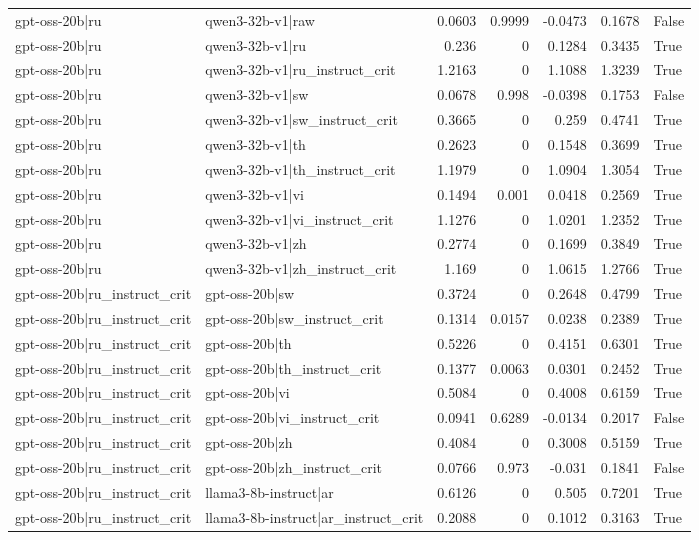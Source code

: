\begin{table}
\begin{tabular}{l l r r r r l}
gpt-oss-20b|ru & qwen3-32b-v1|raw & 0.0603 & 0.9999 & -0.0473 & 0.1678 & False \\
gpt-oss-20b|ru & qwen3-32b-v1|ru & 0.236 & 0 & 0.1284 & 0.3435 & True \\
gpt-oss-20b|ru & qwen3-32b-v1|ru_instruct_crit & 1.2163 & 0 & 1.1088 & 1.3239 & True \\
gpt-oss-20b|ru & qwen3-32b-v1|sw & 0.0678 & 0.998 & -0.0398 & 0.1753 & False \\
gpt-oss-20b|ru & qwen3-32b-v1|sw_instruct_crit & 0.3665 & 0 & 0.259 & 0.4741 & True \\
gpt-oss-20b|ru & qwen3-32b-v1|th & 0.2623 & 0 & 0.1548 & 0.3699 & True \\
gpt-oss-20b|ru & qwen3-32b-v1|th_instruct_crit & 1.1979 & 0 & 1.0904 & 1.3054 & True \\
gpt-oss-20b|ru & qwen3-32b-v1|vi & 0.1494 & 0.001 & 0.0418 & 0.2569 & True \\
gpt-oss-20b|ru & qwen3-32b-v1|vi_instruct_crit & 1.1276 & 0 & 1.0201 & 1.2352 & True \\
gpt-oss-20b|ru & qwen3-32b-v1|zh & 0.2774 & 0 & 0.1699 & 0.3849 & True \\
gpt-oss-20b|ru & qwen3-32b-v1|zh_instruct_crit & 1.169 & 0 & 1.0615 & 1.2766 & True \\
gpt-oss-20b|ru_instruct_crit & gpt-oss-20b|sw & 0.3724 & 0 & 0.2648 & 0.4799 & True \\
gpt-oss-20b|ru_instruct_crit & gpt-oss-20b|sw_instruct_crit & 0.1314 & 0.0157 & 0.0238 & 0.2389 & True \\
gpt-oss-20b|ru_instruct_crit & gpt-oss-20b|th & 0.5226 & 0 & 0.4151 & 0.6301 & True \\
gpt-oss-20b|ru_instruct_crit & gpt-oss-20b|th_instruct_crit & 0.1377 & 0.0063 & 0.0301 & 0.2452 & True \\
gpt-oss-20b|ru_instruct_crit & gpt-oss-20b|vi & 0.5084 & 0 & 0.4008 & 0.6159 & True \\
gpt-oss-20b|ru_instruct_crit & gpt-oss-20b|vi_instruct_crit & 0.0941 & 0.6289 & -0.0134 & 0.2017 & False \\
gpt-oss-20b|ru_instruct_crit & gpt-oss-20b|zh & 0.4084 & 0 & 0.3008 & 0.5159 & True \\
gpt-oss-20b|ru_instruct_crit & gpt-oss-20b|zh_instruct_crit & 0.0766 & 0.973 & -0.031 & 0.1841 & False \\
gpt-oss-20b|ru_instruct_crit & llama3-8b-instruct|ar & 0.6126 & 0 & 0.505 & 0.7201 & True \\
gpt-oss-20b|ru_instruct_crit & llama3-8b-instruct|ar_instruct_crit & 0.2088 & 0 & 0.1012 & 0.3163 & True \\

\end{tabular}
\end{table}
